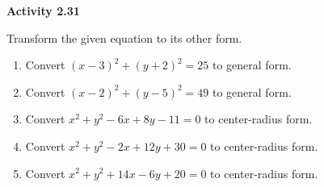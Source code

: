 \vspace{0.3ex}
\noindent\textbf{Activity 2.31}

\vspace{0.2ex}

Transform the given equation to its other form.

\begin{enumerate}
    \item Convert $(x - 3)^2 + (y + 2)^2 = 25$ to general form.
    \item Convert $(x - 2)^2 + (y - 5)^2 = 49$ to general form.
    \item Convert $x^2 + y^2 - 6x + 8y - 11 = 0$ to center-radius form.
    \item Convert $x^2 + y^2 - 2x + 12y + 30 = 0$ to center-radius form.
    \item Convert $x^2 + y^2 + 14x - 6y + 20 = 0$ to center-radius form.
\end{enumerate}
